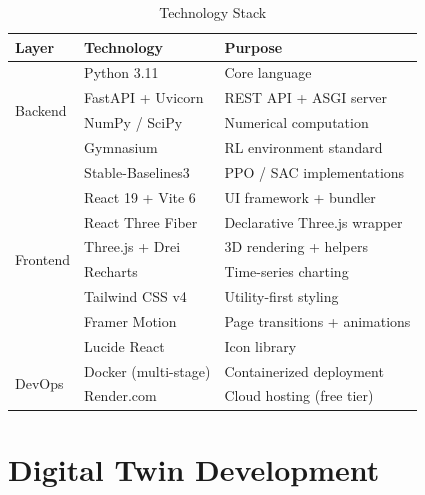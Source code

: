 ﻿\documentclass[12pt, a4paper]{report}
\begin{document}
\begin{table}[H]
\centering
\caption{Technology Stack}
\label{tab:stack}
\begin{tabular}{@{}lll@{}}
\toprule
\textbf{Layer} & \textbf{Technology} & \textbf{Purpose} \\
\midrule
\multirow{4}{*}{Backend}
    & Python 3.11         & Core language \\
    & FastAPI + Uvicorn   & REST API + ASGI server \\
    & NumPy / SciPy       & Numerical computation \\
    & Gymnasium           & RL environment standard \\
    & Stable-Baselines3   & PPO / SAC implementations \\
\midrule
\multirow{6}{*}{Frontend}
    & React 19 + Vite 6   & UI framework + bundler \\
    & React Three Fiber   & Declarative Three.js wrapper \\
    & Three.js + Drei     & 3D rendering + helpers \\
    & Recharts            & Time-series charting \\
    & Tailwind CSS v4     & Utility-first styling \\
    & Framer Motion       & Page transitions + animations \\
    & Lucide React        & Icon library \\
\midrule
\multirow{2}{*}{DevOps}
    & Docker (multi-stage) & Containerized deployment \\
    & Render.com          & Cloud hosting (free tier) \\
\bottomrule
\end{tabular}
\end{table}

\section{Digital Twin Development}
\end{document}

